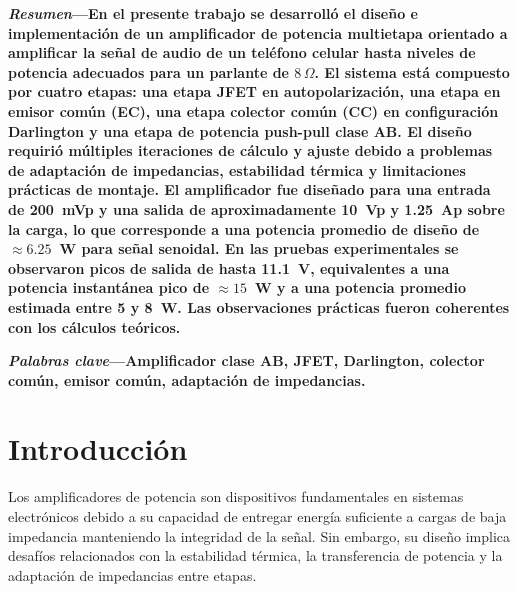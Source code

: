 \documentclass[10pt,twocolumn,letterpaper]{article}
\begin{document}

\noindent\textbf{\textit{Resumen}---En el presente trabajo se desarrolló el diseño e implementación de un amplificador de potencia multietapa orientado a amplificar la señal de audio de un teléfono celular hasta niveles de potencia adecuados para un parlante de \(8\,\Omega\). El sistema está compuesto por cuatro etapas: una etapa JFET en autopolarización, una etapa en emisor común (EC), una etapa colector común (CC) en configuración Darlington y una etapa de potencia push-pull clase AB. El diseño requirió múltiples iteraciones de cálculo y ajuste debido a problemas de adaptación de impedancias, estabilidad térmica y limitaciones prácticas de montaje. El amplificador fue diseñado para una entrada de 200~mVp y una salida de aproximadamente 10~Vp y 1.25~Ap sobre la carga, lo que corresponde a una potencia promedio de diseño de \(\approx 6.25\)~W para señal senoidal. En las pruebas experimentales se observaron picos de salida de hasta 11.1~V, equivalentes a una potencia instantánea pico de \(\approx 15\)~W y a una potencia promedio estimada entre 5 y 8~W. Las observaciones prácticas fueron coherentes con los cálculos teóricos.}

\vspace{0.5em}
\noindent\textbf{\textit{Palabras clave}---Amplificador clase AB, JFET, Darlington, colector común, emisor común, adaptación de impedancias.}

\section{Introducción}
Los amplificadores de potencia son dispositivos fundamentales en sistemas electrónicos debido a su capacidad de entregar energía suficiente a cargas de baja impedancia manteniendo la integridad de la señal. Sin embargo, su diseño implica desafíos relacionados con la estabilidad térmica, la transferencia de potencia y la adaptación de impedancias entre etapas.
\end{document}

